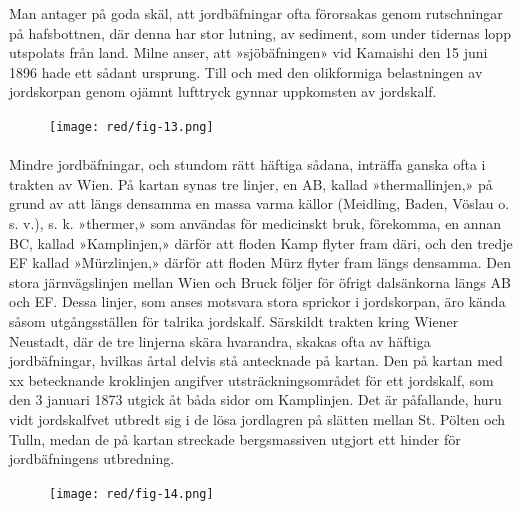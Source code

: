 \documentclass[a4paper, 12pt, oneside, swedish]{article}
\begin{document}
Man antager på goda skäl, att jordbäfningar ofta förorsakas genom rutschningar på hafsbottnen, där denna har stor lutning, av sediment, som under tidernas lopp utspolats från land. Milne anser, att »sjöbäfningen» vid Kamaishi den 15 juni 1896 hade ett sådant ursprung. Till och med den olikformiga belastningen av jordskorpan genom ojämnt lufttryck gynnar uppkomsten av jordskalf.

\begin{figure}[H]
\centering
\texttt{[image: red/fig-13.png]}
\caption{}
\end{figure}
\paragraph{}
Mindre jordbäfningar, och stundom rätt häftiga sådana, inträffa ganska ofta i trakten av Wien. På kartan synas tre linjer, en AB, kallad »thermallinjen,» på grund av att längs densamma en massa varma källor (Meidling, Baden, Vöslau o. s. v.), s. k. »thermer,» som användas för medicinskt bruk, förekomma, en annan BC, kallad »Kamplinjen,» därför att floden Kamp flyter fram däri, och den tredje EF kallad »Mürzlinjen,» därför att floden Mürz flyter fram längs densamma. Den stora järnvägslinjen mellan Wien och Bruck följer för öfrigt dalsänkorna längs AB och EF. Dessa linjer, som anses motsvara stora sprickor i jordskorpan, äro kända såsom utgångsställen för talrika jordskalf. Särskildt trakten kring Wiener Neustadt, där de tre linjerna skära hvarandra, skakas ofta av häftiga jordbäfningar, hvilkas årtal delvis stå antecknade på kartan. Den på kartan med xx betecknande kroklinjen angifver utsträckningsområdet för ett jordskalf, som den 3 januari 1873 utgick åt båda sidor om Kamplinjen. Det är påfallande, huru vidt jordskalfvet utbredt sig i de lösa jordlagren på slätten mellan St. Pölten och Tulln, medan de på kartan streckade bergsmassiven utgjort ett hinder för jordbäfningens utbredning.

\begin{figure}[H]
\centering
\texttt{[image: red/fig-14.png]}
\caption{}
\end{figure}
\end{document}
